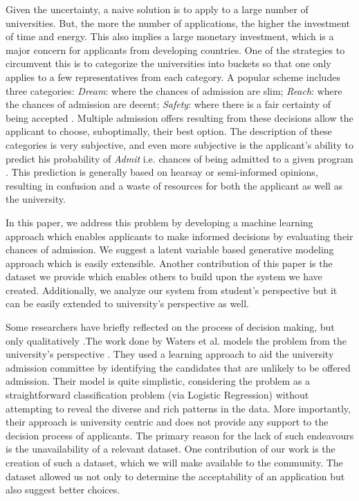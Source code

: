 \documentclass{sig-alternate-05-2015}
\begin{document}
Given the uncertainty, a naive solution is to apply to a large number of universities. But, the more the number of applications, the higher the investment of time and energy. This also implies a large monetary investment, which is a major concern for applicants from developing countries. One of the strategies to circumvent this is to categorize the universities into buckets so that one only applies to a few representatives from each category. A popular scheme includes three categories: \textit{Dream}: where the chances of admission are slim; \textit{Reach}: where the chances of admission are decent; \textit{Safety}: where there is a fair certainty of being accepted \cite{sushnytimes}. Multiple admission offers resulting from these decisions allow the applicant to choose, suboptimally, their best option. The description of these categories is very subjective, and even more subjective is the applicant's ability to predict his probability of \textit{Admit} i.e. chances of being admitted to a given program \cite{sushnytimes}. This prediction is generally based on hearsay or semi-informed opinions, resulting in confusion and a waste of resources for both the applicant as well as the university.

In this paper, we address this problem by developing a machine learning approach which enables applicants to make informed decisions by evaluating their chances of admission. We suggest a latent variable based generative modeling approach which is easily extensible. Another contribution of this paper is the dataset we provide which enables others to build upon the system we have created. Additionally, we analyze our system from student's perspective but it can be easily extended to university's perspective as well.

Some researchers have briefly reflected on the process of decision making, but only qualitatively \cite{dagap}.The work done by Waters et al. models the problem from the university's perspective \cite{waters:iaai13}. They used a learning approach to aid the university admission committee by identifying the candidates that are unlikely to be offered admission. Their model is quite simplistic, considering the problem as a straightforward classification problem (via Logistic Regression) without attempting to reveal the diverse and rich patterns in the data. More importantly, their approach is university centric and does not provide any support to the decision process of applicants. The primary reason for the lack of such endeavours is the unavailability of a relevant dataset. One contribution of our work is the creation of such a dataset, which we will make available to the community. The dataset allowed us not only to determine the acceptability of an application but also suggest better choices.
\end{document}

